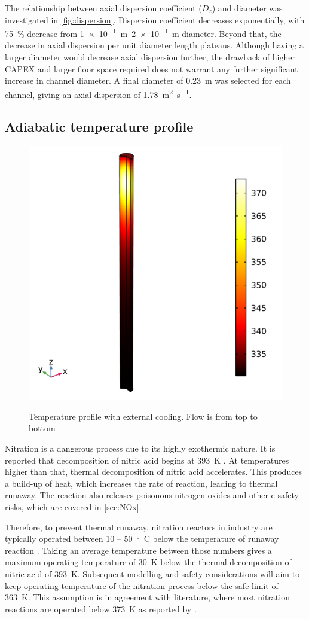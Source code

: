 The relationship between axial dispersion coefficient ($D_z$) and diameter was investigated in \cref{fig:dispersion}. Dispersion coefficient decreases exponentially, with \SI{75}{\%} decrease from \SIrange{1e-1}{2e-1}{\m} diameter. Beyond that, the decrease in axial dispersion per unit diameter length plateaus. Although having a larger diameter would decrease axial dispersion further, the drawback of higher CAPEX and larger floor space required does not warrant any further significant increase in channel diameter. A final diameter of \SI{0.23}{\metre} was selected for each channel, giving an axial dispersion of \SI{1.78}{\metre \squared \per \second}. 

\subsection{Adiabatic temperature profile}
\label{sec:adiabatic}

\begin{figure}
    \vspace{-\intextsep}
    \includegraphics[width=0.3\linewidth]{figures/simple-tube-temperature.png}
    \label{fig:Adiabatic-with-cooling}
    \caption{Temperature profile with external cooling. Flow is from top to bottom}
\end{figure} 
Nitration is a dangerous process due to its highly exothermic nature. It is reported that decomposition of nitric acid begins at \SI{393}{\K} \cite{di_miceli_raimondi_safety_2015}. At temperatures higher than that, thermal decomposition of nitric acid accelerates. This produces a build-up of heat, which increases the rate of reaction, leading to thermal runaway. The reaction also releases poisonous nitrogen oxides and other c safety risks, which are covered in \cref{sec:NOx}. 

Therefore, to prevent thermal runaway, nitration reactors in industry are typically operated between \si{10} – \SI{50}{°C} below the temperature of runaway reaction \cite{noauthor_lees_2012}. Taking an average temperature between those numbers gives a maximum operating temperature of \SI{30}{\K} below the thermal decomposition of nitric acid of \SI{393}{\K}. Subsequent modelling and safety considerations will aim to keep operating temperature of the nitration process below the safe limit of \SI{363}{\K}. This assumption is in agreement with literature, where most nitration reactions are operated below \SI{373}{\K} as reported by \textcite{chen_experimental_1998}.


